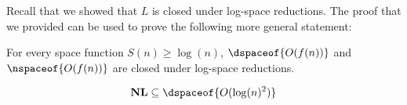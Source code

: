 \documentclass[10pt]{article}
\def\NL{\mathbf{NL}}
\begin{document}


\bigskip

Recall that we showed that $L$ is closed under log-space reductions.
The proof that we provided can be used to prove the following more general statement:

\begin{prop*}

    For every space function $S(n)\geq\log(n)$, $\dspaceof{O(f(n))}$ and $\nspaceof{O(f(n))}$ are closed under log-space reductions.

\end{prop*}

\begin{thrm*}

    \[ \NL \subseteq \dspaceof{O(\log(n)^2)} \]

\end{thrm*}
\end{document}
